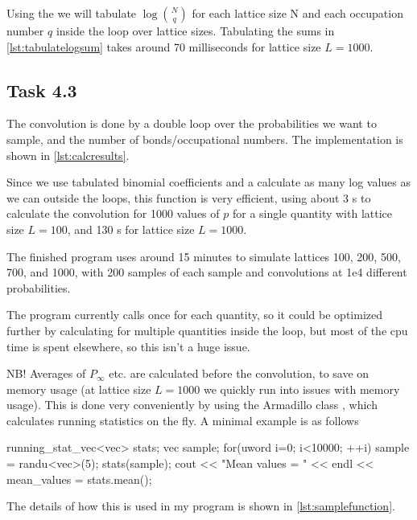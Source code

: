 \documentclass[a4paper]{article}
\begin{document}
\begin{listing}[h!]
%
\caption{%
    A class used to quickly evaluate $\log\binom{n}{k}$ using tabulated values. The implementation of  is shown in \cref{lst:tabulatelogsum}.%
    \label{lst:binomgenerator}%
}
\end{listing}

Using the  we will tabulate $\log\binom{N}{q}$ for each lattice size N and each occupation number $q$ inside the loop over lattice sizes. Tabulating the sums in \cref{lst:tabulatelogsum} takes around 70 milliseconds for lattice size $L=1000$.
\FloatBarrier

\subsection*{Task 4.3}
The convolution is done by a double loop over the probabilities we want to sample, and the number of bonds/occupational numbers. The implementation is shown in \cref{lst:calcresults}.
\begin{listing}[h!]
%
\caption{%
    A function used to calculate the convolution of a quantity $Q$ using \cref{eq:convolution}.%
    \label{lst:calcresults}%
}
\end{listing}

Since we use tabulated binomial coefficients and a calculate as many log values as we can outside the loops, this function is very efficient, using about {3 s} to calculate the convolution for 1000 values of $p$ for a single quantity with lattice size $L=100$, and {130 s} for lattice size $L=1000$.

The finished program uses around 15 minutes to simulate lattices 100, 200, 500, 700, and 1000, with 200 samples of each sample and convolutions at 1e4 different probabilities.

The program currently calls  once for each quantity, so it could be optimized further by calculating for multiple quantities inside the loop, but most of the cpu time is spent elsewhere, so this isn't a huge issue.

NB! Averages of $P_\infty$ etc. are calculated before the convolution, to save on memory usage (at lattice size $L=1000$ we quickly run into issues with memory usage). This is done very conveniently by using the Armadillo class , which calculates running statistics on the fly. A minimal example is as follows%
\begin{cppcode}
running_stat_vec<vec> stats;
vec sample;
for(uword i=0; i<10000; ++i)
{
    sample = randu<vec>(5);
    stats(sample);
}
cout << "Mean values = " << endl << mean_values = stats.mean();
\end{cppcode}
The details of how this is used in my program is shown in \cref{lst:samplefunction}.
\end{document}

